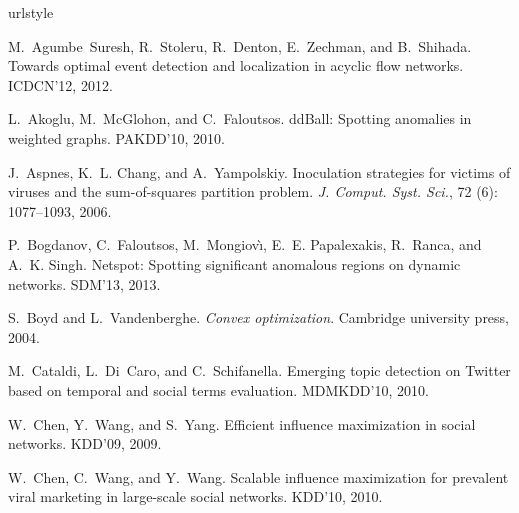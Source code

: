 \setlength{\bibsep}{0.0pt}
\fontsize{9}{10.2}
\selectfont
\begin{thebibliography}{41}
\providecommand{\natexlab}[1]{#1}
\providecommand{\url}[1]{\texttt{#1}}
\expandafter\ifx\csname urlstyle\endcsname\relax
  \providecommand{\doi}[1]{doi: #1}\else
  \providecommand{\doi}{doi: \begingroup \urlstyle{rm}\Url}\fi

M.~Agumbe~Suresh, R.~Stoleru, R.~Denton, E.~Zechman, and B.~Shihada.
\newblock Towards optimal event detection and localization in acyclic flow
  networks.
\newblock ICDCN'12, 2012.

L.~Akoglu, M.~McGlohon, and C.~Faloutsos.
dd{B}all: Spotting anomalies in weighted graphs.
\newblock PAKDD'10, 2010.

J.~Aspnes, K.~L. Chang, and A.~Yampolskiy.
\newblock Inoculation strategies for victims of viruses and the sum-of-squares
  partition problem.
\newblock \emph{J. Comput. Syst. Sci.}, 72 (6): 1077--1093,
  2006.

P.~Bogdanov, C.~Faloutsos, M.~Mongiov\`{\i}, E.~E. Papalexakis, R.~Ranca, and
  A.~K. Singh.
\newblock Netspot: Spotting significant anomalous regions on dynamic networks.
\newblock SDM'13, 2013.

S.~Boyd and L.~Vandenberghe.
\newblock \emph{Convex optimization}.
\newblock Cambridge university press, 2004.

M.~Cataldi, L.~Di~Caro, and C.~Schifanella.
\newblock Emerging topic detection on {T}witter based on temporal and social
  terms evaluation.
\newblock MDMKDD'10, 2010.

W.~Chen, Y.~Wang, and S.~Yang.
\newblock Efficient influence maximization in social networks.
\newblock KDD'09, 2009.

W.~Chen, C.~Wang, and Y.~Wang.
\newblock Scalable influence maximization for prevalent viral marketing in
  large-scale social networks.
\newblock KDD'10, 2010.


\end{thebibliography}
